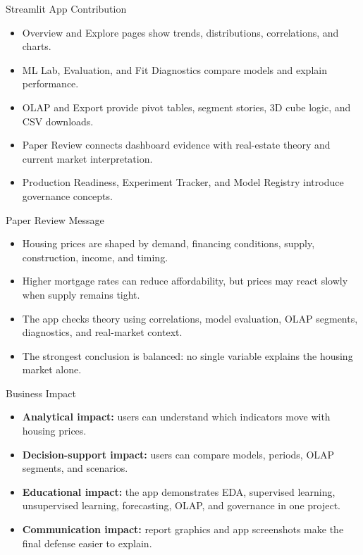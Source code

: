 \documentclass[aspectratio=169]{beamer}
\begin{document}
\begin{frame}{Streamlit App Contribution}
\begin{itemize}
  \item Overview and Explore pages show trends, distributions, correlations, and charts.
  \item ML Lab, Evaluation, and Fit Diagnostics compare models and explain performance.
  \item OLAP and Export provide pivot tables, segment stories, 3D cube logic, and CSV downloads.
  \item Paper Review connects dashboard evidence with real-estate theory and current market interpretation.
  \item Production Readiness, Experiment Tracker, and Model Registry introduce governance concepts.
\end{itemize}
\end{frame}

\begin{frame}{Paper Review Message}
\begin{itemize}
  \item Housing prices are shaped by demand, financing conditions, supply, construction, income, and timing.
  \item Higher mortgage rates can reduce affordability, but prices may react slowly when supply remains tight.
  \item The app checks theory using correlations, model evaluation, OLAP segments, diagnostics, and real-market context.
  \item The strongest conclusion is balanced: no single variable explains the housing market alone.
\end{itemize}
\end{frame}

\begin{frame}{Business Impact}
\begin{itemize}
  \item \textbf{Analytical impact:} users can understand which indicators move with housing prices.
  \item \textbf{Decision-support impact:} users can compare models, periods, OLAP segments, and scenarios.
  \item \textbf{Educational impact:} the app demonstrates EDA, supervised learning, unsupervised learning, forecasting, OLAP, and governance in one project.
  \item \textbf{Communication impact:} report graphics and app screenshots make the final defense easier to explain.
\end{itemize}
\end{frame}
\end{document}

